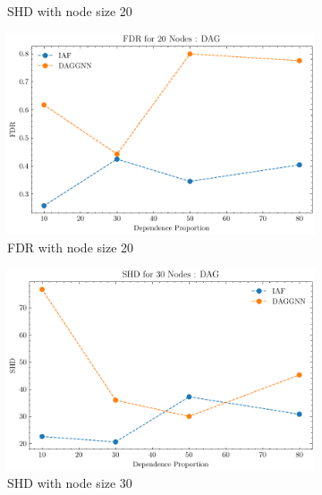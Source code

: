 \documentclass[10pt]{article}
\begin{document}
\begin{figure}
\begin{subfigure}{0.45\textwidth}
        \caption{SHD with node size 20}
        \label{SHD_node20}
    \end{subfigure}
    \hfill
    \begin{subfigure}{0.45\textwidth}
        \includegraphics[width=\textwidth]{fig/FDR_dependence_20_DAG_threshold0.3.pdf}
        \caption{FDR with node size 20}
        \label{FDR_node20}
    \end{subfigure}
    \begin{subfigure}{0.45\textwidth}
        \includegraphics[width=\textwidth]{fig/SHD_dependence_30_DAG_threshold0.3.pdf}
        \caption{SHD with node size 30}
        \label{SHD_node30}
    \end{subfigure}
    \hfill
    \begin{subfigure}{0.45\textwidth}

\end{subfigure}
\end{figure}
\end{document}
